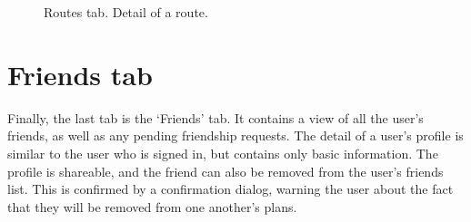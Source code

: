 \begin{figure}[h!]
    \centering
    \hfill
    \hfill
    \caption{Routes tab. Detail of a route.}
    \label{fig:routes}
\end{figure}

\section{Friends tab}
Finally, the last tab is the `Friends' tab.
It contains a view of all the user's friends, as well as any pending friendship requests.
The detail of a user's profile is similar to the user who is signed in, but contains only basic information.
The profile is shareable, and the friend can also be removed from the user's friends list.
This is confirmed by a confirmation dialog, warning the user about the fact that they will be removed from one another's plans.

